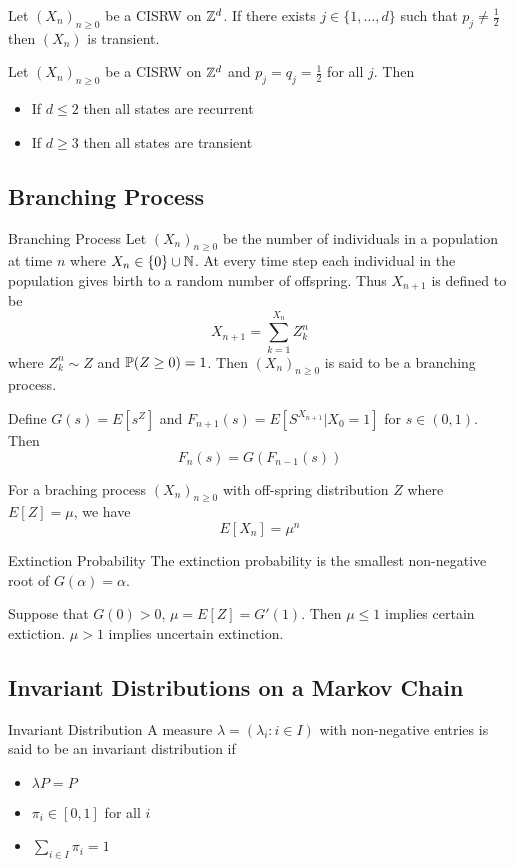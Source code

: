 \documentclass[a4paper]{article}
\begin{document}
\begin{prp}{}{} Let $(X_n)_{n\geq 0}$ be a CISRW on $\mathbb{Z}^d$. If there exists $j\in\{1,\dots,d\}$ such that $p_j\neq\frac{1}{2}$ then $(X_n)$ is transient. 
\end{prp}

\begin{prp}{}{} Let $(X_n)_{n\geq 0}$ be a CISRW on $\mathbb{Z}^d$ and $p_j=q_j=\frac{1}{2}$ for all $j$. Then
\begin{itemize}
\item If $d\leq 2$ then all states are recurrent
\item If $d\geq 3$ then all states are transient
\end{itemize}
\end{prp}

\subsection{Branching Process}
\begin{defn}{Branching Process}{} Let $(X_n)_{n\geq 0}$ be the number of individuals in a population at time $n$ where $X_n\in\{0\}\cup\mathbb{N}$. At every time step each individual in the population gives birth to a random number of offspring. Thus $X_{n+1}$ is defined to be $$X_{n+1}=\sum_{k=1}^{X_n}Z_k^n$$ where $Z_k^n\sim Z$ and $\mathbb{P}(Z\geq 0)=1$. Then $(X_n)_{n\geq 0}$ is said to be a branching process. 
\end{defn}

\begin{prp}{}{} Define $G(s)=E[s^Z]$ and $F_{n+1}(s)=E[S^{X_{n+1}}|X_0=1]$ for $s\in(0,1)$. Then $$F_n(s)=G(F_{n-1}(s))$$
\end{prp}

\begin{prp}{}{} For a braching process $(X_n)_{n\geq 0}$ with off-spring distribution $Z$ where $E[Z]=\mu$, we have $$E[X_n]=\mu^n$$
\end{prp}

\begin{thm}{Extinction Probability}{} The extinction probability is the smallest non-negative root of $G(\alpha)=\alpha$. 
\end{thm}

\begin{thm}{}{} Suppose that $G(0)>0$, $\mu=E[Z]=G'(1)$. Then $\mu\leq 1$ implies certain extiction. $\mu>1$ implies uncertain extinction. 
\end{thm}

\subsection{Invariant Distributions on a Markov Chain}
\begin{defn}{Invariant Distribution}{} A measure $\lambda=(\lambda_i:i\in I)$ with non-negative entries is said to be an invariant distribution if 
\begin{itemize}
\item $\lambda P=P$
\item $\pi_i\in[0,1]$ for all $i$
\item $\sum_{i\in I}\pi_i=1$
\end{itemize}
\end{defn}
\end{document}
